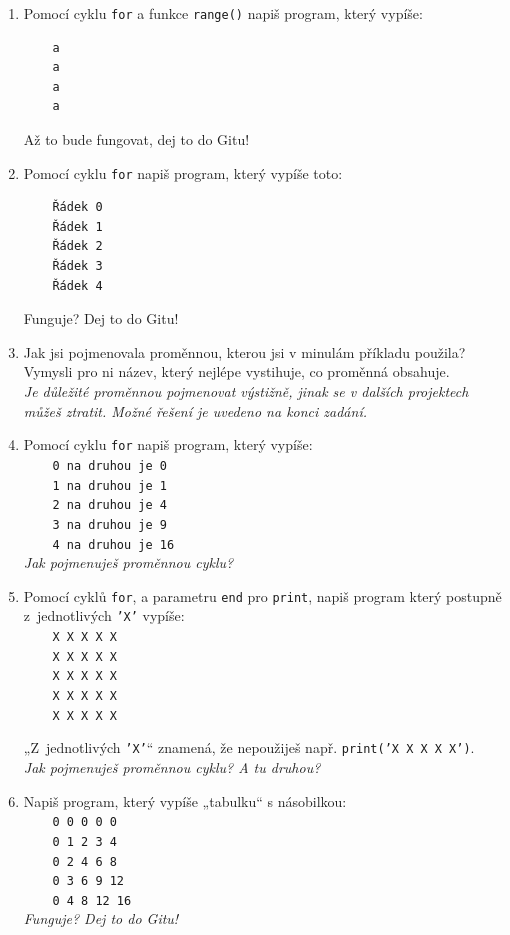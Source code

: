\documentclass[a4paper,10pt]{article}
\begin{document}
\begin{enumerate}[resume]
\item Pomocí cyklu \verb+for+ a funkce \texttt{range()} napiš program, který vypíše:
\begin{verbatim}
    a
    a
    a
    a
\end{verbatim}
    Až to bude fungovat, dej to do Gitu!

\item Pomocí cyklu \verb+for+ napiš program, který vypíše toto:
\begin{verbatim}
    Řádek 0
    Řádek 1
    Řádek 2
    Řádek 3
    Řádek 4
\end{verbatim}
    Funguje? Dej to do Gitu!

\item Jak jsi pojmenovala proměnnou, kterou jsi v minulám příkladu použila?
    Vymysli pro ni název, který nejlépe vystihuje, co proměnná obsahuje.
    \\\emph{\small Je důležité proměnnou pojmenovat výstižně, jinak se v dalších projektech můžeš ztratit.
            Možné řešení je uvedeno na konci zadání.}
    \label{cisloradku}

\item Pomocí cyklu \verb+for+ napiš program, který vypíše:
\\\verb+    0 na druhou je 0+
\\\verb+    1 na druhou je 1+
\\\verb+    2 na druhou je 4+
\\\verb+    3 na druhou je 9+
\\\verb+    4 na druhou je 16+
    \\\emph{\small Jak pojmenuješ proměnnou cyklu?}

\item Pomocí cyklů \verb+for+, a parametru \verb+end+ pro \verb+print+, napiš
    program který postupně z~jednotlivých \texttt{'X'} vypíše:
\\\verb+    X X X X X+
\\\verb+    X X X X X+
\\\verb+    X X X X X+
\\\verb+    X X X X X+
\\\verb+    X X X X X+

„Z~jednotlivých \texttt{'X'}“ znamená, že nepoužiješ např. \texttt{print('X X X X X')}.
    \\\emph{\small Jak pojmenuješ proměnnou cyklu? A tu druhou?}

\item Napiš program, který vypíše „tabulku“ s násobilkou:
\\\verb+    0 0 0 0 0+
\\\verb+    0 1 2 3 4+
\\\verb+    0 2 4 6 8+
\\\verb+    0 3 6 9 12+
\\\verb+    0 4 8 12 16+
    \\\emph{\small Funguje? Dej to do Gitu!}


\end{enumerate}
\end{document}
